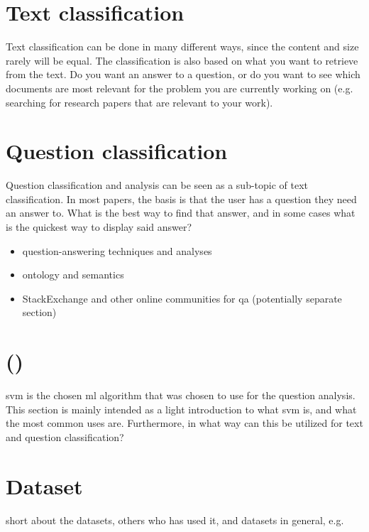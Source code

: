 \section{Text classification}
\label{sec:text_classification}
Text classification can be done in many different ways, since the content and size rarely will be equal. 
The classification is also based on what you want to retrieve from the text. 
Do you want an answer to a question, or do you want to see which documents are most relevant for the problem you are currently working on 
(e.g. searching for research papers that are relevant to your work).

\section{Question classification}
\label{sec:question_answering}
Question classification and analysis can be seen as a sub-topic of text classification. 
In most papers, the basis is that the user has a question they need an answer to. 
What is the best way to find that answer, and in some cases what is the quickest way to display said answer?
 
\begin{itemize}
	\item question-answering techniques and analyses
	\item ontology and semantics
	\item StackExchange and other online communities for qa (potentially separate section)
\end{itemize}

\section{ ()}
\label{sec:svm}
\gls{svm} is the chosen \gls{ml} algorithm that was chosen to use for the question analysis. 
This section is mainly intended as a light introduction to what \gls{svm} is, and what the most common uses are. 
Furthermore, in what way can this be utilized for text and question classification?

\section{Dataset}
\label{sec:dataset}
short about the datasets, others who has used it, and datasets in general, e.g. 
\cite{Klein2016,SpaceMachine.net2016,Wissner-Gross2016}
